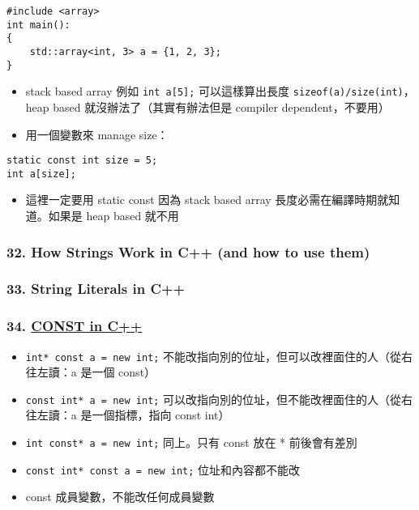 \documentclass[11pt]{article}
\providecommand{\tightlist}{%
      \setlength{\itemsep}{0pt}\setlength{\parskip}{0pt}}
\begin{document}
\begin{verbatim}
#include <array>
int main():
{
    std::array<int, 3> a = {1, 2, 3};
}
\end{verbatim}

\begin{itemize}
\tightlist
\item
  stack based array 例如 \texttt{int\ a{[}5{]};} 可以這樣算出長度
  \texttt{sizeof(a)/size(int)}，heap based 就沒辦法了（其實有辦法但是
  compiler dependent，不要用）
\item
  用一個變數來 manage size：
\end{itemize}

\begin{verbatim}
static const int size = 5;
int a[size];
\end{verbatim}

\begin{itemize}
\tightlist
\item
  這裡一定要用 static const 因為 stack based array
  長度必需在編譯時期就知道。如果是 heap based 就不用
\end{itemize}

\hypertarget{how-strings-work-in-c-and-how-to-use-them}{%
\subsubsection{32. How Strings Work in C++ (and how to use
them)}\label{how-strings-work-in-c-and-how-to-use-them}}

\hypertarget{string-literals-in-c}{%
\subsubsection{33. String Literals in C++}\label{string-literals-in-c}}

\hypertarget{const-in-c}{%
\subsubsection{\texorpdfstring{34.
\href{https://www.youtube.com/watch?v=4fJBrditnJU\&list=PLlrATfBNZ98dudnM48yfGUldqGD0S4FFb\&index=35\&t=0s}{CONST
in C++}}{34. CONST in C++}}\label{const-in-c}}

\begin{itemize}
\tightlist
\item
  \texttt{int*\ const\ a\ =\ new\ int;}
  不能改指向別的位址，但可以改裡面住的人（從右往左讀：a 是一個 const）
\item
  \texttt{const\ int*\ a\ =\ new\ int;}
  可以改指向別的位址，但不能改裡面住的人（從右往左讀：a 是一個指標，指向
  const int）
\item
  \texttt{int\ const*\ a\ =\ new\ int;} 同上。只有 const 放在 *
  前後會有差別
\item
  \texttt{const\ int*\ const\ a\ =\ new\ int;} 位址和內容都不能改
\item
  const 成員變數，不能改任何成員變數
\end{itemize}
\end{document}
